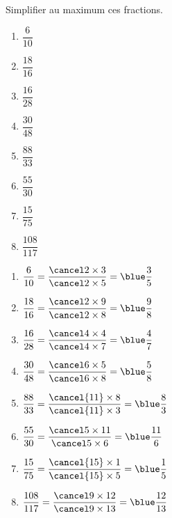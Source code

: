 \begin{exercice*}
   Simplifier au maximum ces fractions. \medskip
   \begin{multicols}{4}
      \begin{enumerate}
         \item $\dfrac{6}{10}$ \bigskip
         \item $\dfrac{18}{16}$ \bigskip
         \item $\dfrac{16}{28}$
         \item $\dfrac{30}{48}$
         \item $\dfrac{88}{33}$
         \item $\dfrac{55}{30}$
         \item $\dfrac{15}{75}$
         \item $\dfrac{108}{117}$
      \end{enumerate}
   \end{multicols}
\end{exercice*}
\begin{corrige}
   \begin{multicols}{4}
      \begin{enumerate}
         \item $\dfrac{6}{10} =\dfrac{\cancel2\times3}{\cancel2\times5} =\blue\dfrac35$ \bigskip
         \item $\dfrac{18}{16} =\dfrac{\cancel2\times9}{\cancel2\times8} =\blue\dfrac98$ \bigskip
         \item $\dfrac{16}{28} =\dfrac{\cancel4\times4}{\cancel4\times7} =\blue\dfrac47$ \bigskip
         \item $\dfrac{30}{48} =\dfrac{\cancel6\times5}{\cancel6\times8} =\blue\dfrac58$ \bigskip
         \item $\dfrac{88}{33} =\dfrac{\cancel{11}\times8}{\cancel{11}\times3} =\blue\dfrac83$ \bigskip
         \item $\dfrac{55}{30} =\dfrac{\cancel5\times11}{\cancel5\times6} =\blue\dfrac{11}6$ \bigskip
         \item $\dfrac{15}{75} =\dfrac{\cancel{15}\times1}{\cancel{15}\times5} =\blue\dfrac15$ \bigskip
         \item $\dfrac{108}{117} =\dfrac{\cancel9\times12}{\cancel9\times13} =\blue\dfrac{12}{13}$
      \end{enumerate}
   \end{multicols}
\end{corrige}